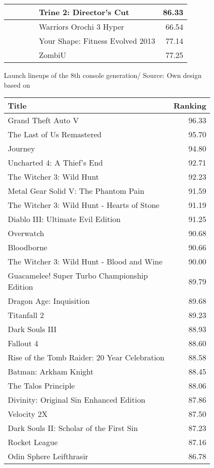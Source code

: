 \documentclass
[
    a4paper,
    11pt
]
{article}
\begin{document}
\begin{appendix}
\begin{figure}
\begin{tabular}{ | p{3.5cm} | r | p{3.5cm} | r | p{3.5cm} | r |}
		&&&&Trine 2: Director's Cut&86.33\\ \hline
		&&&&Warriors Orochi 3 Hyper&66.54\\ \hline
		&&&&Your Shape: Fitness Evolved 2013&77.14\\ \hline
		&&&&ZombiU&77.25\\\hline
    \end{tabular}
    \caption{Launch lineups of the 8th console generation/ Source: Own design based on \cite{Gamerankings2016}}
    \label{tab:gen8launchlineup}
\end{figure}
%
\begin{figure}
	\centering
 	\small
\begin{tabular}{  p{8cm} r }
   \hline
    Title&Ranking \\\hline \hline
    Grand Theft Auto V&96.33\\
    The Last of Us Remastered&95.70\\
    Journey&94.80\\
    Uncharted 4: A Thief's End&92.71\\
    The Witcher 3: Wild Hunt&92.23\\
    Metal Gear Solid V: The Phantom Pain&91.59\\
    The Witcher 3: Wild Hunt - Hearts of Stone&91.19\\
    Diablo III: Ultimate Evil Edition&91.25\\
    Overwatch&90.68\\
    Bloodborne&90.66\\
    The Witcher 3: Wild Hunt - Blood and Wine&90.00\\
    Guacamelee! Super Turbo Championship Edition&89.79\\
    Dragon Age: Inquisition&89.68\\
    Titanfall 2&89.23\\
    Dark Souls III&88.93\\
    Fallout 4&88.60\\
    Rise of the Tomb Raider: 20 Year Celebration&88.58\\
    Batman: Arkham Knight&88.45\\
    The Talos Principle&88.06\\
    Divinity: Original Sin Enhanced Edition&    87.86\\
    Velocity 2X&87.50\\
    Dark Souls II: Scholar of the First Sin&87.23\\
    Rocket League&87.16\\
    Odin Sphere Leifthrasir&86.78\\

\end{tabular}
\end{figure}
\end{appendix}
\end{document}
